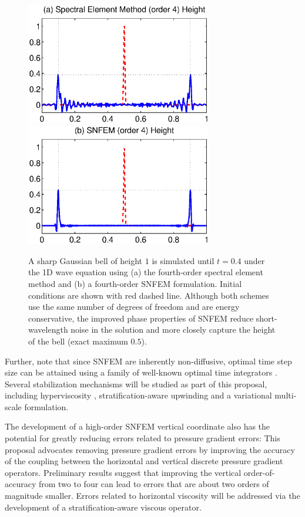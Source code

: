 \documentclass[11pt]{article}
\begin{document}
\begin{figure}
\begin{center}
\includegraphics[width=3.2in]{SimulatedBell_SE}
\includegraphics[width=3.2in]{SimulatedBell_SNFEM}
\end{center}
\caption{A sharp Gaussian bell of height $1$ is simulated until $t = 0.4$ under the 1D wave equation using (a) the fourth-order spectral element method and (b) a fourth-order SNFEM formulation.  Initial conditions are shown with red dashed line.  Although both schemes use the same number of degrees of freedom and are energy conservative, the improved phase properties of SNFEM reduce short-wavelength noise in the solution and more closely capture the height of the bell (exact maximum $0.5$).}  \label{fig:SimulatedBell}
\end{figure}

Further, note that since SNFEM are inherently non-diffusive, optimal time step size can be attained using a family of well-known optimal time integrators \cite{kinnmark1984one}.  Several stabilization mechanisms will be studied as part of this proposal, including hyperviscosity \cite{guba2014viscosity, ullrich2014global}, stratification-aware upwinding and a variational multi-scale formulation.

The development of a high-order SNFEM vertical coordinate also has the potential for greatly reducing errors related to pressure gradient errors:  This proposal advocates removing pressure gradient errors by improving the accuracy of the coupling between the horizontal and vertical discrete pressure gradient operators.  Preliminary results suggest that improving the vertical order-of-accuracy from two to four can lead to errors that are about two orders of magnitude smaller.  Errors related to horizontal viscosity will be addressed via the development of a stratification-aware viscous operator.
\end{document}
